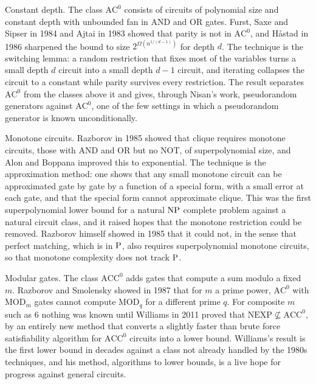 Constant depth. The class $\mathrm{AC}^0$ consists of circuits of polynomial size and constant depth with unbounded fan in AND and OR gates. Furst, Saxe and Sipser in 1984 and Ajtai in 1983 showed that parity is not in $\mathrm{AC}^0$, and H{\aa}stad in 1986 sharpened the bound to size $2^{\Omega(n^{1/(d-1)})}$ for depth $d$. The technique is the switching lemma: a random restriction that fixes most of the variables turns a small depth $d$ circuit into a small depth $d - 1$ circuit, and iterating collapses the circuit to a constant while parity survives every restriction. The result separates $\mathrm{AC}^0$ from the classes above it and gives, through Nisan's work, pseudorandom generators against $\mathrm{AC}^0$, one of the few settings in which a pseudorandom generator is known unconditionally.

Monotone circuits. Razborov in 1985 showed that clique requires monotone circuits, those with AND and OR but no NOT, of superpolynomial size, and Alon and Boppana improved this to exponential. The technique is the approximation method: one shows that any small monotone circuit can be approximated gate by gate by a function of a special form, with a small error at each gate, and that the special form cannot approximate clique. This was the first superpolynomial lower bound for a natural $\mathrm{NP}$ complete problem against a natural circuit class, and it raised hopes that the monotone restriction could be removed. Razborov himself showed in 1985 that it could not, in the sense that perfect matching, which is in $\mathrm{P}$, also requires superpolynomial monotone circuits, so that monotone complexity does not track $\mathrm{P}$.

Modular gates. The class $\mathrm{ACC}^0$ adds gates that compute a sum modulo a fixed $m$. Razborov and Smolensky showed in 1987 that for $m$ a prime power, $\mathrm{AC}^0$ with $\mathrm{MOD}_m$ gates cannot compute $\mathrm{MOD}_q$ for a different prime $q$. For composite $m$ such as $6$ nothing was known until Williams in 2011 proved that $\mathrm{NEXP} \not\subseteq \mathrm{ACC}^0$, by an entirely new method that converts a slightly faster than brute force satisfiability algorithm for $\mathrm{ACC}^0$ circuits into a lower bound. Williams's result is the first lower bound in decades against a class not already handled by the 1980s techniques, and his method, algorithms to lower bounds, is a live hope for progress against general circuits.

